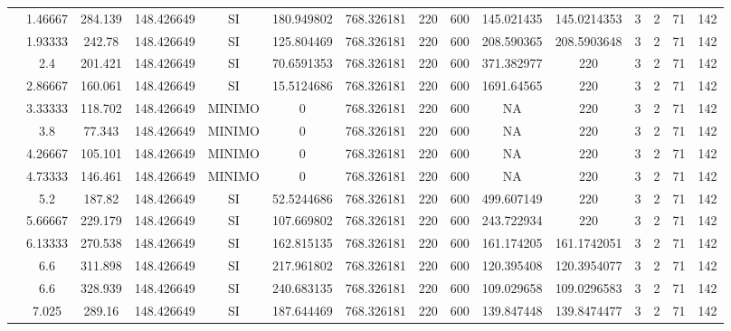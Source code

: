 \begin{table}[H]
{\begin{tabular}{|c|c|c|c|c|c|c|c|c|c|c|c|c|c|c|}
\cline{2-15}    & 1.46667 & 284.139 & 148.426649 & SI  & 180.949802 & 768.326181 & 220 & 600 & 145.021435 & 145.0214353 & 3   & 2   & 71  & 142 \bigstrut\\
\cline{2-15}    & 1.93333 & 242.78 & 148.426649 & SI  & 125.804469 & 768.326181 & 220 & 600 & 208.590365 & 208.5903648 & 3   & 2   & 71  & 142 \bigstrut\\
\cline{2-15}    & 2.4 & 201.421 & 148.426649 & SI  & 70.6591353 & 768.326181 & 220 & 600 & 371.382977 & 220 & 3   & 2   & 71  & 142 \bigstrut\\
\cline{2-15}    & 2.86667 & 160.061 & 148.426649 & SI  & 15.5124686 & 768.326181 & 220 & 600 & 1691.64565 & 220 & 3   & 2   & 71  & 142 \bigstrut\\
\cline{2-15}    & 3.33333 & 118.702 & 148.426649 & MINIMO & 0   & 768.326181 & 220 & 600 & NA  & 220 & 3   & 2   & 71  & 142 \bigstrut\\
\cline{2-15}    & 3.8 & 77.343 & 148.426649 & MINIMO & 0   & 768.326181 & 220 & 600 & NA  & 220 & 3   & 2   & 71  & 142 \bigstrut\\
\cline{2-15}    & 4.26667 & 105.101 & 148.426649 & MINIMO & 0   & 768.326181 & 220 & 600 & NA  & 220 & 3   & 2   & 71  & 142 \bigstrut\\
\cline{2-15}    & 4.73333 & 146.461 & 148.426649 & MINIMO & 0   & 768.326181 & 220 & 600 & NA  & 220 & 3   & 2   & 71  & 142 \bigstrut\\
\cline{2-15}    & 5.2 & 187.82 & 148.426649 & SI  & 52.5244686 & 768.326181 & 220 & 600 & 499.607149 & 220 & 3   & 2   & 71  & 142 \bigstrut\\
\cline{2-15}    & 5.66667 & 229.179 & 148.426649 & SI  & 107.669802 & 768.326181 & 220 & 600 & 243.722934 & 220 & 3   & 2   & 71  & 142 \bigstrut\\
\cline{2-15}    & 6.13333 & 270.538 & 148.426649 & SI  & 162.815135 & 768.326181 & 220 & 600 & 161.174205 & 161.1742051 & 3   & 2   & 71  & 142 \bigstrut\\
\cline{2-15}    & 6.6 & 311.898 & 148.426649 & SI  & 217.961802 & 768.326181 & 220 & 600 & 120.395408 & 120.3954077 & 3   & 2   & 71  & 142 \bigstrut\\
\cline{2-15}    & 6.6 & 328.939 & 148.426649 & SI  & 240.683135 & 768.326181 & 220 & 600 & 109.029658 & 109.0296583 & 3   & 2   & 71  & 142 \bigstrut\\
\cline{2-15}    & 7.025 & 289.16 & 148.426649 & SI  & 187.644469 & 768.326181 & 220 & 600 & 139.847448 & 139.8474477 & 3   & 2   & 71  & 142 \bigstrut\\

\end{tabular}}
\end{table}
